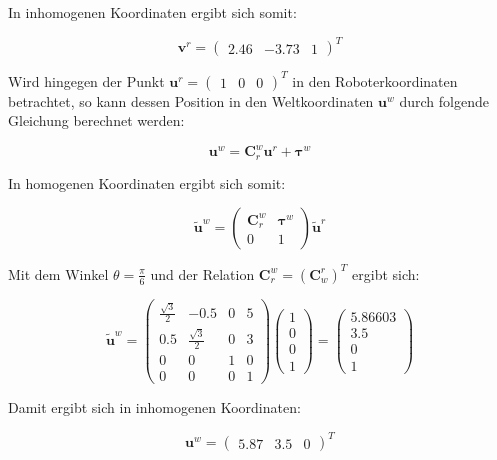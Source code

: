 \documentclass[12pt,a4paper]{report}
\begin{document}
In inhomogenen Koordinaten ergibt sich somit:

\[\mathbf{v}^r = \begin{pmatrix} 2.46 & -3.73 & 1 \end{pmatrix}^{T}\]

Wird hingegen der Punkt \(\mathbf{u}^r = \begin{pmatrix} 1 & 0 & 0 \end{pmatrix}^{T}\) in den Roboterkoordinaten betrachtet, so kann dessen Position in den Weltkoordinaten \(\mathbf{u}^w\) durch folgende Gleichung berechnet werden:

\[
    \mathbf{u}^w = \mathbf{C}^w_r\mathbf{u}^r + \boldsymbol{\tau}^w
\]

In homogenen Koordinaten ergibt sich somit:

\[
    \tilde{\mathbf{u}}^w =
    \begin{pmatrix}
        \mathbf{C}^w_r & \boldsymbol{\tau}^w \\
        0              & 1
    \end{pmatrix}
    \tilde{\mathbf{u}}^r
\]

Mit dem Winkel \(\theta = \frac{\pi}{6}\) und der Relation \(\mathbf{C}^w_r = (\mathbf{C}^r_w)^T\) ergibt sich:

\[
    \tilde{\mathbf{u}}^w = \begin{pmatrix}
        \frac{\sqrt{3}}{2} & -0.5               & 0 & 5 \\
        0.5                & \frac{\sqrt{3}}{2} & 0 & 3 \\
        0                  & 0                  & 1 & 0 \\
        0                  & 0                  & 0 & 1
    \end{pmatrix}
    \begin{pmatrix}
        1 \\ 0 \\ 0 \\ 1
    \end{pmatrix}
    =
    \begin{pmatrix}
        5.86603 \\ 3.5 \\ 0 \\ 1
    \end{pmatrix}
\]

Damit ergibt sich in inhomogenen Koordinaten:

\[\mathbf{u}^w = \begin{pmatrix} 5.87 & 3.5 & 0 \end{pmatrix}^{T}\]
\end{document}

